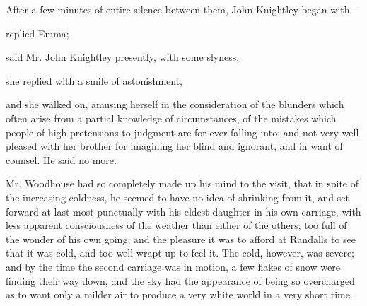 After a few minutes of entire silence between them, John Knightley began with---


 replied Emma; 

 said Mr. John Knightley presently, with some slyness, 

 she replied with a smile of astonishment, 




 and she walked on, amusing herself in the consideration of the blunders which often arise from a partial knowledge of circumstances, of the mistakes which people of high pretensions to judgment are for ever falling into; and not very well pleased with her brother for imagining her blind and ignorant, and in want of counsel. He said no more.

Mr. Woodhouse had so completely made up his mind to the visit, that in spite of the increasing coldness, he seemed to have no idea of shrinking from it, and set forward at last most punctually with his eldest daughter in his own carriage, with less apparent consciousness of the weather than either of the others; too full of the wonder of his own going, and the pleasure it was to afford at Randalls to see that it was cold, and too well wrapt up to feel it. The cold, however, was severe; and by the time the second carriage was in motion, a few flakes of snow were finding their way down, and the sky had the appearance of being so overcharged as to want only a milder air to produce a very white world in a very short time.

